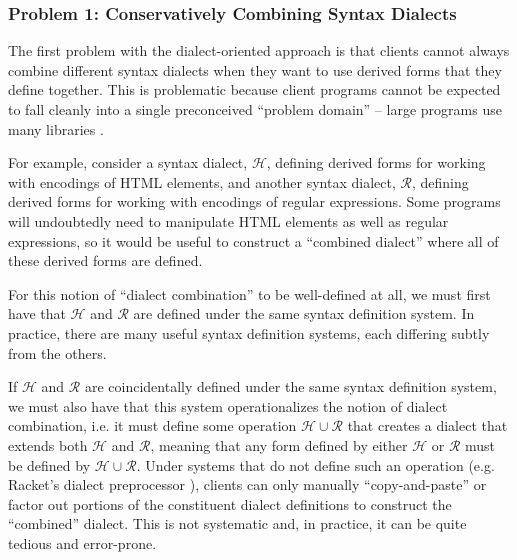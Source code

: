 \subsubsection{Problem 1: Conservatively Combining Syntax Dialects}
The first problem with the dialect-oriented approach is that clients  cannot always combine different syntax dialects when they want to use derived forms that they define together. This is problematic because client programs  cannot be expected to fall cleanly into a single preconceived ``problem domain'' -- large programs use many libraries \cite{DBLP:conf/sac/LammelPS11}.

For example, consider a syntax dialect, $\mathcal{H}$, defining derived forms for working with encodings of HTML elements, and another syntax dialect, $\mathcal{R}$,  defining derived forms for working with encodings of regular expressions. Some programs will undoubtedly need to manipulate HTML elements as well as regular expressions, so it would be useful to construct a ``combined dialect'' where all of these derived forms are defined. 

For this notion of ``dialect combination'' to be well-defined at all, we must first have that $\mathcal{H}$ and $\mathcal{R}$ are defined under the same syntax definition system. In practice, there are many useful syntax definition systems, each differing subtly from the others. %

If $\mathcal{H}$ and $\mathcal{R}$ are coincidentally defined under the same syntax definition system, we must also have that this system operationalizes the notion of dialect combination, i.e. it must define some operation $\mathcal{H} \cup \mathcal{R}$ that creates a dialect that extends both $\mathcal{H}$ and $\mathcal{R}$, meaning that any form defined by either $\mathcal{H}$ or $\mathcal{R}$ must be defined by $\mathcal{H} \cup \mathcal{R}$. Under systems that do not define such an operation (e.g. Racket's dialect preprocessor \cite{Flatt:2012:CLR:2063176.2063195}), clients can only manually  ``copy-and-paste'' or factor out portions of the constituent dialect definitions to construct the ``combined'' dialect. This is not systematic and, in practice, it can be quite tedious and error-prone. %

